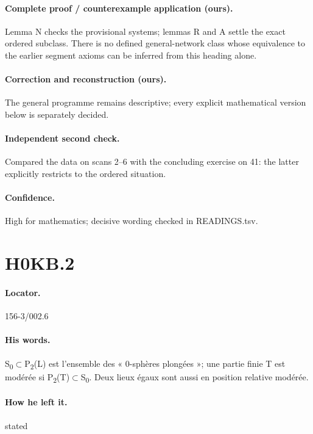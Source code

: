 \paragraph{Complete proof / counterexample application (ours).} Lemma N checks the provisional systems; lemmas R and A settle the exact ordered subclass. There is no defined general-network class whose equivalence to the earlier segment axioms can be inferred from this heading alone.

\paragraph{Correction and reconstruction (ours).} The general programme remains descriptive; every explicit mathematical version below is separately decided.

\paragraph{Independent second check.} Compared the data on scans 2–6 with the concluding exercise on 41: the latter explicitly restricts to the ordered situation.

\paragraph{Confidence.} High for mathematics; decisive wording checked in READINGS.tsv.

\section*{H0KB.2}\label{statement:H0KB.2}
\paragraph{Locator.} 156-3/002.6

\paragraph{His words.} S\textsubscript{0}\ensuremath{\subset}P\textsubscript{2}(L) est l’ensemble des « 0-sphères plongées »; une partie finie T est modérée si P\textsubscript{2}(T)\ensuremath{\subset}S\textsubscript{0}. Deux lieux égaux sont aussi en position relative modérée.

\paragraph{How he left it.} stated

